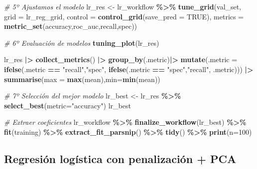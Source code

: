 \documentclass[12pt,a4paper,]{book}
\newenvironment{Shaded}{\begin{snugshade}}{\end{snugshade}}
\newcommand{\AttributeTok}[1]{\textcolor[rgb]{0.13,0.29,0.53}{#1}}
\newcommand{\CommentTok}[1]{\textcolor[rgb]{0.56,0.35,0.01}{\textit{#1}}}
\newcommand{\ConstantTok}[1]{\textcolor[rgb]{0.56,0.35,0.01}{#1}}
\newcommand{\DecValTok}[1]{\textcolor[rgb]{0.00,0.00,0.81}{#1}}
\newcommand{\FunctionTok}[1]{\textcolor[rgb]{0.13,0.29,0.53}{\textbf{#1}}}
\newcommand{\NormalTok}[1]{#1}
\newcommand{\OtherTok}[1]{\textcolor[rgb]{0.56,0.35,0.01}{#1}}
\newcommand{\SpecialCharTok}[1]{\textcolor[rgb]{0.81,0.36,0.00}{\textbf{#1}}}
\newcommand{\StringTok}[1]{\textcolor[rgb]{0.31,0.60,0.02}{#1}}
\numberwithin{dummy}{section}
\theoremstyle{ocrenumbox}
\theoremstyle{blacknumex}
\theoremstyle{blacknumbox}
\theoremstyle{ocrenum}
\theoremstyle{ocrenum}
\begin{document}
\begin{Shaded}
\begin{Highlighting}[]
\CommentTok{\# 5º Ajustamos el modelo}
\NormalTok{lr\_res }\OtherTok{\textless{}{-}} 
\NormalTok{  lr\_workflow }\SpecialCharTok{\%\textgreater{}\%} 
  \FunctionTok{tune\_grid}\NormalTok{(val\_set,}
            \AttributeTok{grid =}\NormalTok{ lr\_reg\_grid,}
            \AttributeTok{control =} \FunctionTok{control\_grid}\NormalTok{(}\AttributeTok{save\_pred =} \ConstantTok{TRUE}\NormalTok{),}
            \AttributeTok{metrics =} \FunctionTok{metric\_set}\NormalTok{(accuracy,roc\_auc,recall,spec))}

\CommentTok{\# 6º Evaluación de modelos}
\FunctionTok{tuning\_plot}\NormalTok{(lr\_res)}

\NormalTok{lr\_res }\SpecialCharTok{|\textgreater{}} 
  \FunctionTok{collect\_metrics}\NormalTok{() }\SpecialCharTok{|\textgreater{}} 
  \FunctionTok{group\_by}\NormalTok{(.metric)}\SpecialCharTok{|\textgreater{}} 
  \FunctionTok{mutate}\NormalTok{(}\AttributeTok{.metric =} \FunctionTok{ifelse}\NormalTok{(.metric }\SpecialCharTok{==} \StringTok{"recall"}\NormalTok{,}\StringTok{"spec"}\NormalTok{,}
                          \FunctionTok{ifelse}\NormalTok{(.metric }\SpecialCharTok{==} \StringTok{"spec"}\NormalTok{,}\StringTok{"recall"}\NormalTok{,}
\NormalTok{                                 .metric))) }\SpecialCharTok{|\textgreater{}} 
  \FunctionTok{summarise}\NormalTok{(}\AttributeTok{max =} \FunctionTok{max}\NormalTok{(mean),}\AttributeTok{min=}\FunctionTok{min}\NormalTok{(mean))   }


\CommentTok{\# 7º Selección del mejor modelo}
\NormalTok{lr\_best }\OtherTok{\textless{}{-}} 
\NormalTok{  lr\_res }\SpecialCharTok{\%\textgreater{}\%} 
  \FunctionTok{select\_best}\NormalTok{(}\AttributeTok{metric=}\StringTok{"accuracy"}\NormalTok{)}
\NormalTok{lr\_best}

\CommentTok{\# Extraer coeficientes}
\NormalTok{lr\_workflow }\SpecialCharTok{\%\textgreater{}\%} 
  \FunctionTok{finalize\_workflow}\NormalTok{(lr\_best) }\SpecialCharTok{\%\textgreater{}\%}
  \FunctionTok{fit}\NormalTok{(training) }\SpecialCharTok{\%\textgreater{}\%} 
  \FunctionTok{extract\_fit\_parsnip}\NormalTok{() }\SpecialCharTok{\%\textgreater{}\%} 
  \FunctionTok{tidy}\NormalTok{() }\SpecialCharTok{\%\textgreater{}\%} 
  \FunctionTok{print}\NormalTok{(}\AttributeTok{n=}\DecValTok{100}\NormalTok{)}
\end{Highlighting}
\end{Shaded}

\hypertarget{regresiuxf3n-loguxedstica-con-penalizaciuxf3n-pca-1}{%
\subsection{Regresión logística con penalización +
PCA}\label{regresiuxf3n-loguxedstica-con-penalizaciuxf3n-pca-1}}
\end{document}
